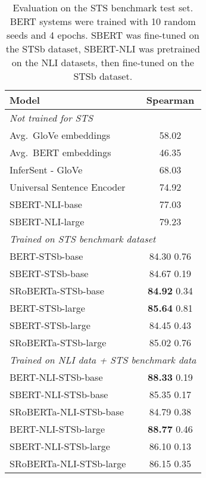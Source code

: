 \documentclass[11pt,a4paper]{article}
\begin{document}
\begin{table}[h]
	\centering 
	\footnotesize
	\begin{tabular}{|l|c|}
		\hline
		\textbf{Model} & \textbf{Spearman} \\ \hline
		\multicolumn{2}{|l|}{\textit{Not trained for STS}} \\ \hline
		Avg.\ GloVe embeddings & 58.02\\
		Avg.\ BERT embeddings &  46.35\\
		InferSent - GloVe &  68.03 \\
		Universal Sentence Encoder &  74.92\\
		SBERT-NLI-base  &  77.03\\
		SBERT-NLI-large & 79.23 \\ \hline 
		\multicolumn{2}{|l|}{\textit{Trained on STS benchmark dataset}} \\ \hline
		BERT-STSb-base & 84.30  0.76  \\
		SBERT-STSb-base & 84.67  0.19 \\ 
		SRoBERTa-STSb-base & \textbf{84.92}  0.34 \\ \hline 
		
		BERT-STSb-large  & \textbf{85.64}  0.81 \\ 
		SBERT-STSb-large & 84.45  0.43 \\ 
		SRoBERTa-STSb-large & 85.02  0.76 \\ \hline 
		
		\multicolumn{2}{|l|}{\textit{Trained on NLI data + STS benchmark data}} \\ \hline
		
		BERT-NLI-STSb-base & \textbf{88.33}  0.19 \\ 
		SBERT-NLI-STSb-base & 85.35  0.17 \\ 
		SRoBERTa-NLI-STSb-base & 84.79  0.38 \\ \hline
		
		BERT-NLI-STSb-large & \textbf{88.77}  0.46 \\ 
		SBERT-NLI-STSb-large & 86.10  0.13  \\
		SRoBERTa-NLI-STSb-large & 86.15  0.35 \\ \hline 
	\end{tabular}
	\caption{Evaluation on the STS benchmark test set. BERT systems were trained with 10 random seeds and 4 epochs. SBERT was fine-tuned on the STSb dataset, SBERT-NLI was pretrained on the NLI datasets, then fine-tuned on the STSb dataset. }
	\label{table_stsb}
\end{table}
\end{document}
